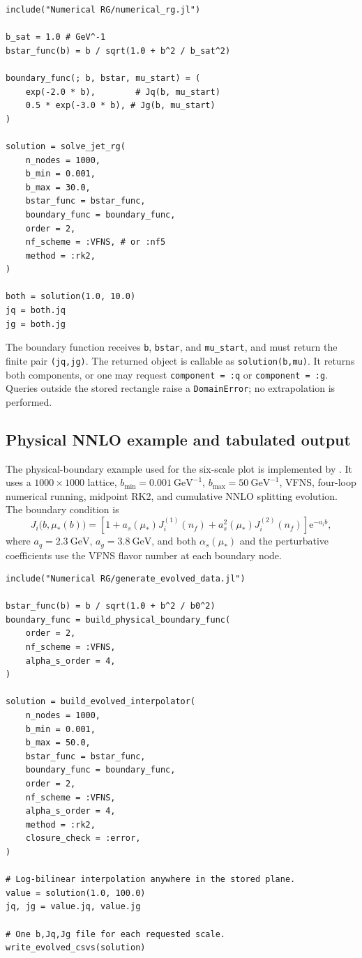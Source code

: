 \documentclass[11pt]{article}
\newcommand{\ee}{\mathrm{e}}
\begin{document}
\begin{lstlisting}
include("Numerical RG/numerical_rg.jl")

b_sat = 1.0 # GeV^-1
bstar_func(b) = b / sqrt(1.0 + b^2 / b_sat^2)

boundary_func(; b, bstar, mu_start) = (
    exp(-2.0 * b),        # Jq(b, mu_start)
    0.5 * exp(-3.0 * b), # Jg(b, mu_start)
)

solution = solve_jet_rg(
    n_nodes = 1000,
    b_min = 0.001,
    b_max = 30.0,
    bstar_func = bstar_func,
    boundary_func = boundary_func,
    order = 2,
    nf_scheme = :VFNS, # or :nf5
    method = :rk2,
)

both = solution(1.0, 10.0)
jq = both.jq
jg = both.jg
\end{lstlisting}

The boundary function receives \texttt{b}, \texttt{bstar}, and
\texttt{mu\_start}, and must return the finite pair \texttt{(jq,jg)}.
The returned object is callable as \texttt{solution(b,mu)}. It returns both
components, or one may request \texttt{component = :q} or
\texttt{component = :g}. Queries outside the stored rectangle raise a
\texttt{DomainError}; no extrapolation is performed.

\subsection{Physical NNLO example and tabulated output}

The physical-boundary example used for the six-scale plot is implemented by
. It uses a \(1000\times1000\) lattice,
\(b_{\min}=0.001~\mathrm{GeV}^{-1}\),
\(b_{\max}=50~\mathrm{GeV}^{-1}\), VFNS, four-loop numerical running,
midpoint RK2, and cumulative NNLO splitting evolution. The boundary condition
is
\[
  J_i\bigl(b,\mu_*(b)\bigr)
  =
  \left[
    1+a_s(\mu_*)J_i^{(1)}(n_f)
     +a_s^2(\mu_*)J_i^{(2)}(n_f)
  \right]\ee^{-a_i b},
\]
where \(a_q=2.3~\mathrm{GeV}\), \(a_g=3.8~\mathrm{GeV}\), and both
\(\alpha_s(\mu_*)\) and the perturbative coefficients use the VFNS flavor
number at each boundary node.

\begin{lstlisting}
include("Numerical RG/generate_evolved_data.jl")

bstar_func(b) = b / sqrt(1.0 + b^2 / b0^2)
boundary_func = build_physical_boundary_func(
    order = 2,
    nf_scheme = :VFNS,
    alpha_s_order = 4,
)

solution = build_evolved_interpolator(
    n_nodes = 1000,
    b_min = 0.001,
    b_max = 50.0,
    bstar_func = bstar_func,
    boundary_func = boundary_func,
    order = 2,
    nf_scheme = :VFNS,
    alpha_s_order = 4,
    method = :rk2,
    closure_check = :error,
)

# Log-bilinear interpolation anywhere in the stored plane.
value = solution(1.0, 100.0)
jq, jg = value.jq, value.jg

# One b,Jq,Jg file for each requested scale.
write_evolved_csvs(solution)
\end{lstlisting}
\end{document}
